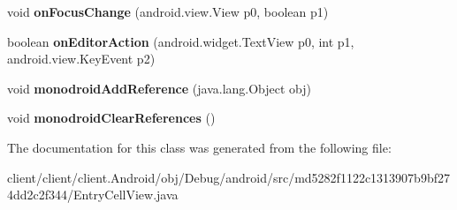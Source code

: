 \begin{DoxyCompactItemize}
\item 
\hypertarget{classmd5282f1122c1313907b9bf274dd2c2f344_1_1EntryCellView_a74a9acb00e44e455cafc45754ddcf1f8}{}void {\bfseries on\+Focus\+Change} (android.\+view.\+View p0, boolean p1)\label{classmd5282f1122c1313907b9bf274dd2c2f344_1_1EntryCellView_a74a9acb00e44e455cafc45754ddcf1f8}

\item 
\hypertarget{classmd5282f1122c1313907b9bf274dd2c2f344_1_1EntryCellView_a609e2948e961b5996cb97942b48a8061}{}boolean {\bfseries on\+Editor\+Action} (android.\+widget.\+Text\+View p0, int p1, android.\+view.\+Key\+Event p2)\label{classmd5282f1122c1313907b9bf274dd2c2f344_1_1EntryCellView_a609e2948e961b5996cb97942b48a8061}

\item 
\hypertarget{classmd5282f1122c1313907b9bf274dd2c2f344_1_1EntryCellView_a00875f97a7ccca1517c65ec144d497b8}{}void {\bfseries monodroid\+Add\+Reference} (java.\+lang.\+Object obj)\label{classmd5282f1122c1313907b9bf274dd2c2f344_1_1EntryCellView_a00875f97a7ccca1517c65ec144d497b8}

\item 
\hypertarget{classmd5282f1122c1313907b9bf274dd2c2f344_1_1EntryCellView_a09ee78f5aa15b217d2b21793b975de85}{}void {\bfseries monodroid\+Clear\+References} ()\label{classmd5282f1122c1313907b9bf274dd2c2f344_1_1EntryCellView_a09ee78f5aa15b217d2b21793b975de85}

\end{DoxyCompactItemize}


The documentation for this class was generated from the following file\+:\begin{DoxyCompactItemize}
\item 
client/client/client.\+Android/obj/\+Debug/android/src/md5282f1122c1313907b9bf274dd2c2f344/Entry\+Cell\+View.\+java\end{DoxyCompactItemize}
